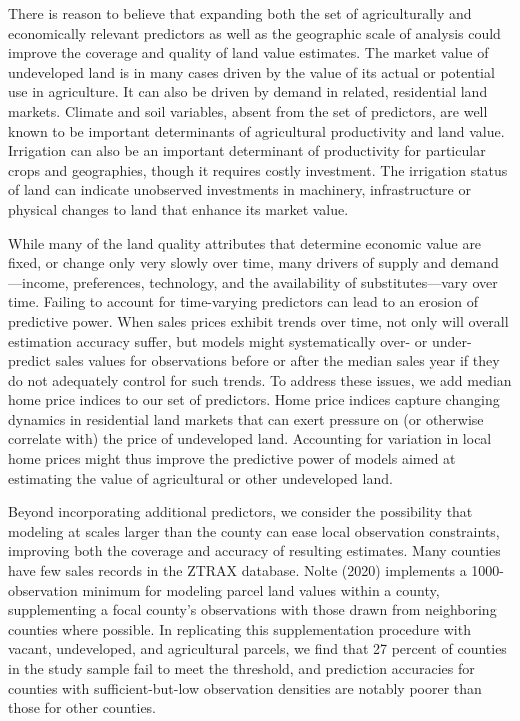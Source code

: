 \documentclass[12pt]{article}
\begin{document}
There is reason to believe that expanding both the set of agriculturally and economically relevant predictors as well as the geographic scale of analysis could improve the coverage and quality of land value estimates. The market value of undeveloped land is in many cases driven by the value of its actual or potential use in agriculture. It can also be driven by demand in related, residential land markets. Climate and soil variables, absent from the set of \textcite{Nolte2020High-resolutionStates} predictors, are well known to be important determinants of agricultural productivity and land value. Irrigation can also be an important determinant of productivity for particular crops and geographies, though it requires costly investment. The irrigation status of land can indicate unobserved investments in machinery, infrastructure or physical changes to land that enhance its market value. 

While many of the land quality attributes that determine economic value are fixed, or change only very slowly over time, many drivers of supply and demand—income, preferences, technology, and the availability of substitutes---vary over time. Failing to account for time-varying predictors can lead to an erosion of predictive power. When sales prices exhibit trends over time, not only will overall estimation accuracy suffer, but models might systematically over- or under-predict sales values for observations before or after the median sales year if they do not adequately control for such trends. To address these issues, we add median home price indices to our set of predictors. Home price indices capture changing dynamics in residential land markets that can exert pressure on (or otherwise correlate with) the price of undeveloped land. Accounting for variation in local home prices might thus improve the predictive power of models aimed at estimating the value of agricultural or other undeveloped land. 

Beyond incorporating additional predictors, we consider the possibility that modeling at scales larger than the county can ease local observation constraints, improving both the coverage and accuracy of resulting estimates. Many counties have few sales records in the ZTRAX database. Nolte (2020) implements a 1000-observation minimum for modeling parcel land values within a county, supplementing a focal county’s observations with those drawn from neighboring counties where possible. In replicating this supplementation procedure with vacant, undeveloped, and agricultural parcels, we find that 27 percent of counties in the study sample fail to meet the threshold, and prediction accuracies for counties with sufficient-but-low observation densities are notably poorer than those for other counties. 
\end{document}
